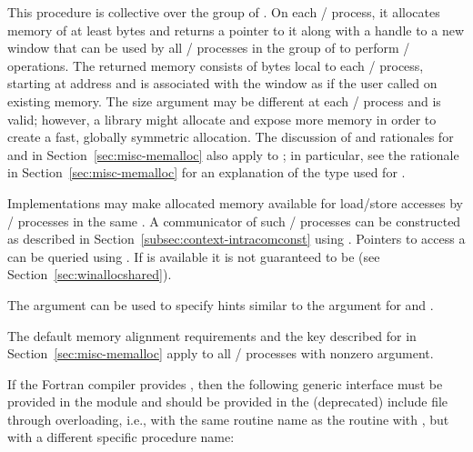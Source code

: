 This procedure is collective over the group of
. On each \mpi/ process, it allocates memory of at least
 bytes and returns a pointer to it along with a handle to a new window that
can be used by all \mpi/ processes in the group of  to perform \RMA/
operations.  The returned memory consists of  bytes local
to each \mpi/ process, starting at address  and is associated
with the window as if the user called  on
existing memory. The size argument may be different at each \mpi/ process and
 is valid; however, a library might allocate and expose
more memory in order to create a fast, globally symmetric allocation.
The discussion of and rationales for  and
 in Section~\ref{sec:misc-memalloc} also apply to
; in particular, see the rationale in
Section~\ref{sec:misc-memalloc} for an explanation of the type used for
.

Implementations may make allocated memory available for load/store accesses
by \MPI/ processes in the same .
A communicator of such \MPI/ processes can be constructed as described in Section~\ref{subsec:context-intracomconst} using .
Pointers to access a  can be queried
using .
If  is available
it is not guaranteed to be  (see Section~\ref{sec:winallocshared}).

The  argument can be used to specify hints
similar to the  argument for  and
.

The default memory alignment requirements and the
  key described
for  in Section~\ref{sec:misc-memalloc} apply to
all \mpi/ processes with nonzero  argument.
 
If the Fortran compiler provides , 
then the following generic interface must be provided in the 
module and should be provided in the (deprecated)  include file through overloading, 
i.e., with the same routine name as the
routine with  ,
but with a different specific procedure name:
 
